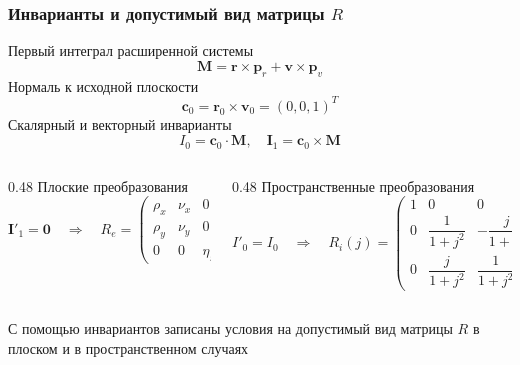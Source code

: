 \begin{frame}[t]
    \frametitle{Инварианты и допустимый вид матрицы \(R\)}
    \presentationtextsize
    Первый интеграл расширенной системы
    \[
    \mathbf M=\mathbf r\times\mathbf p_r+\mathbf v\times\mathbf p_v
    \]
    Нормаль к исходной плоскости
    \[
    \mathbf c_0=\mathbf r_0\times\mathbf v_0=(0,0,1)^T 
    \]
    Скалярный и векторный инварианты
    \[
    I_0=\mathbf c_0\cdot\mathbf M,\quad
    \mathbf I_1=\mathbf c_0\times\mathbf M 
    \]
    \begin{columns}[T,onlytextwidth]
        \begin{column}{0.48\textwidth}
            Плоские преобразования
            \[
            \mathbf I'_1=\mathbf 0
            \quad\Rightarrow\quad
            R_e=
            \begin{pmatrix}
            \rho_x & \nu_x & 0\\
            \rho_y & \nu_y & 0\\
            0&0&\eta_z
            \end{pmatrix}.
            \]
        \end{column}
        \begin{column}{0.48\textwidth}
            Пространственные преобразования
            \[
            I'_0=I_0
            \quad\Rightarrow\quad
            R_i(j)=
            \begin{pmatrix}
            1&0&0\\
            0&\dfrac{1}{1+j^2}&-\dfrac{j}{1+j^2}\\
            0&\dfrac{j}{1+j^2}&\dfrac{1}{1+j^2}
            \end{pmatrix}.
            \]
        \end{column}
    \end{columns}
    \begin{newresult}
        С помощью инвариантов записаны условия на допустимый вид матрицы \(R\) в плоском и в пространственном случаях
    \end{newresult}
\end{frame}

